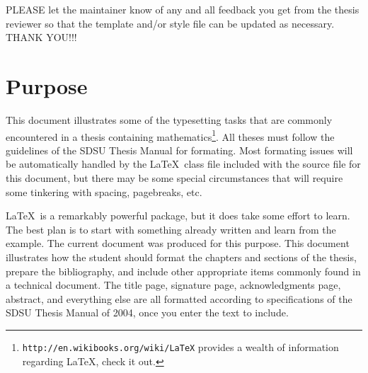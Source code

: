 PLEASE let the maintainer know of any and all feedback you get from
the thesis reviewer so that the template and/or style file can be
updated as necessary.  THANK YOU!!!


\section{Purpose}

This document illustrates some of the typesetting tasks that are
commonly encountered in a thesis containing
mathematics\footnote{\texttt{http://en.wikibooks.org/wiki/LaTeX}\quad
  provides a wealth of information regarding \LaTeX, check it out.}.
All theses must follow the guidelines of the SDSU Thesis Manual for
formating.  Most formating issues will be automatically handled by the
\LaTeX\ class file included with the source file for this document,
but there may be some special circumstances that will require some
tinkering with spacing, pagebreaks, etc.

\LaTeX\ is a remarkably powerful package, but it does take some effort
to learn.  The best plan is to start with something already written
and learn from the example.  The current document was produced for
this purpose.  This document illustrates how the student should format
the chapters and sections of the thesis, prepare the bibliography, and
include other appropriate items commonly found in a technical
document.  The title page, signature page, acknowledgments page,
abstract, and everything else are all formatted according to
specifications of the SDSU Thesis Manual of 2004, once you enter the
text to include.

